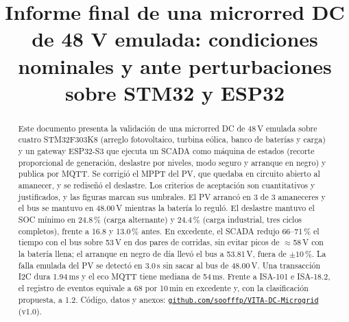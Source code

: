\documentclass[conference]{IEEEtran}
\begin{document}
\title{Informe final de una microrred DC de 48 V emulada: condiciones nominales y ante perturbaciones sobre STM32 y ESP32\\
}

\author{
\and
{}
}

\maketitle

\begin{abstract}
Este documento presenta la validación de una microrred DC de 48\,V emulada sobre cuatro STM32F303K8 (arreglo fotovoltaico, turbina eólica, banco de baterías y carga) y un gateway ESP32-S3 que ejecuta un SCADA como máquina de estados (recorte proporcional de generación, deslastre por niveles, modo seguro y arranque en negro) y publica por MQTT. Se corrigió el MPPT del PV, que quedaba en circuito abierto al amanecer, y se rediseñó el deslastre. Los criterios de aceptación son cuantitativos y justificados, y las figuras marcan sus umbrales. El PV arrancó en 3 de 3 amaneceres y el bus se mantuvo en 48.00\,V mientras la batería lo reguló. El deslastre mantuvo el SOC mínimo en 24.8\,\% (carga alternante) y 24.4\,\% (carga industrial, tres ciclos completos), frente a 16.8 y 13.0\,\% antes. En excedente, el SCADA redujo 66--71\,\% el tiempo con el bus sobre 53\,V en dos pares de corridas, sin evitar picos de $\approx$58\,V con la batería llena; el arranque en negro de día llevó el bus a 53.81\,V, fuera de $\pm10$\,\%. La falla emulada del PV se detectó en 3.0\,s sin sacar al bus de 48.00\,V. Una transacción I2C dura 1.94\,ms y el eco MQTT tiene mediana de 54\,ms. Frente a ISA-101 e ISA-18.2, el registro de eventos equivale a 68 por 10\,min en excedente y, con la clasificación propuesta, a 1.2. Código, datos y anexos: \href{https://github.com/soofffp/VITA-DC-Microgrid}{\texttt{github.com/soofffp/VITA-DC-Microgrid}} (v1.0).
\end{abstract}
\end{document}
